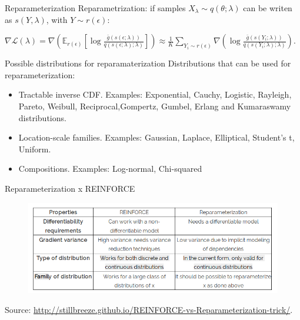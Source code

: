 \documentclass{beamer}
\def \Ev {{\mathbb E}}
\def \gu {{\bar{g}}}
\begin{document}
\begin{frame}{}
\begin{block}{Reparameterization}
Reparametrization: if samples $X_\lambda \sim q(\theta;\lambda)$ can be writen as $s(Y,\lambda)$, with $Y \sim r(\epsilon)$:

$\nabla \mathcal{L}(\lambda) = \nabla \left( \Ev_{r(\epsilon)} \left[\log \frac{ \gu(s(\epsilon;\lambda))}{q(s(\epsilon;\lambda);\lambda)}\right]\right) \approx \frac{1}{K} \sum_{Y_i \sim r(\epsilon)} \nabla \left( \log \frac{ \gu(s(Y_i;\lambda))}{q(s(Y_i;\lambda);\lambda)} \right).$
\end{block}
\begin{block}{Possible distributions for reparamaterization}
Distributions that can be used for reparameterization:
\begin{itemize}
	\item Tractable inverse CDF. Examples: Exponential, Cauchy, Logistic, Rayleigh, Pareto, Weibull, Reciprocal,Gompertz, Gumbel, Erlang and Kumaraswamy distributions.
	\item Location-scale families. Examples: Gaussian, Laplace, Elliptical, Student's t, Uniform.
	\item Compositions. Examples: Log-normal, Chi-squared
\end{itemize}
\end{block}
\end{frame}
\begin{frame}{}
\begin{block}{Reparameterization x REINFORCE}
\begin{figure}[h]
	\centering
	\includegraphics[height=.35\linewidth]{figs/reinforce_x_reparameterization.png}
\end{figure}
Source: \url{http://stillbreeze.github.io/REINFORCE-vs-Reparameterization-trick/}.
\end{block}
\end{frame}
\end{document}

